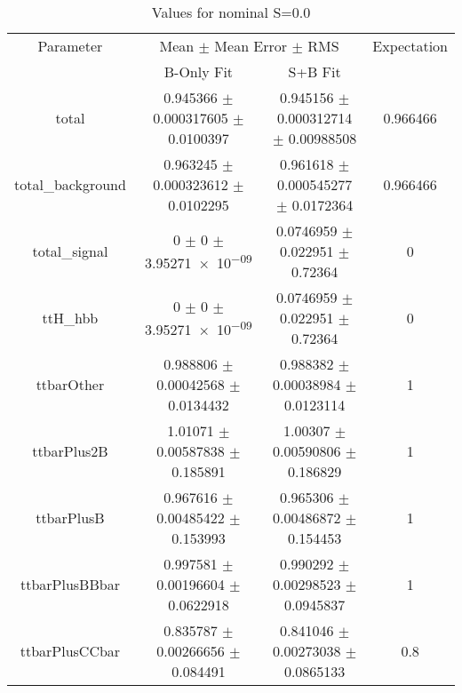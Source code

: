 \begin{table}
\centering
\caption{Values for nominal S=0.0}
\begin{tabular}{cccc}
\toprule
Parameter & \multicolumn{2}{c}{Mean $\pm$ Mean Error $\pm$ RMS} & Expectation\\
 & B-Only Fit & S+B Fit & \\
\midrule
total & \num{0.945366} $\pm$ \num{0.000317605} $\pm$ \num{0.0100397} & \num{0.945156} $\pm$ \num{0.000312714} $\pm$ \num{0.00988508} & \num{0.966466}\\
total\_background & \num{0.963245} $\pm$ \num{0.000323612} $\pm$ \num{0.0102295} & \num{0.961618} $\pm$ \num{0.000545277} $\pm$ \num{0.0172364} & \num{0.966466}\\
total\_signal & \num{0} $\pm$ \num{0} $\pm$ \num{3.95271e-09} & \num{0.0746959} $\pm$ \num{0.022951} $\pm$ \num{0.72364} & \num{0}\\
ttH\_hbb & \num{0} $\pm$ \num{0} $\pm$ \num{3.95271e-09} & \num{0.0746959} $\pm$ \num{0.022951} $\pm$ \num{0.72364} & \num{0}\\
ttbarOther & \num{0.988806} $\pm$ \num{0.00042568} $\pm$ \num{0.0134432} & \num{0.988382} $\pm$ \num{0.00038984} $\pm$ \num{0.0123114} & \num{1}\\
ttbarPlus2B & \num{1.01071} $\pm$ \num{0.00587838} $\pm$ \num{0.185891} & \num{1.00307} $\pm$ \num{0.00590806} $\pm$ \num{0.186829} & \num{1}\\
ttbarPlusB & \num{0.967616} $\pm$ \num{0.00485422} $\pm$ \num{0.153993} & \num{0.965306} $\pm$ \num{0.00486872} $\pm$ \num{0.154453} & \num{1}\\
ttbarPlusBBbar & \num{0.997581} $\pm$ \num{0.00196604} $\pm$ \num{0.0622918} & \num{0.990292} $\pm$ \num{0.00298523} $\pm$ \num{0.0945837} & \num{1}\\
ttbarPlusCCbar & \num{0.835787} $\pm$ \num{0.00266656} $\pm$ \num{0.084491} & \num{0.841046} $\pm$ \num{0.00273038} $\pm$ \num{0.0865133} & \num{0.8}\\
\bottomrule
\end{tabular}
\end{table}